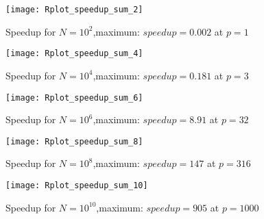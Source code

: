 \documentclass[11pt]{scrartcl} %
\begin{document}
\begin{figure}[H] %
	\centering
	\texttt{[image: Rplot\_speedup\_sum\_2]} %
	\caption{Speedup for $N=10^2$,maximum: $speedup = 0.002$ at $p = 1$}
\end{figure}


\begin{figure}[H] %
	\centering
	\texttt{[image: Rplot\_speedup\_sum\_4]} %
	\caption{Speedup for $N=10^4$,maximum: $speedup = 0.181$ at $p = 3$}
\end{figure}

\begin{figure}[H] %
	\centering
	\texttt{[image: Rplot\_speedup\_sum\_6]} %
	\caption{Speedup for $N=10^6$,maximum: $speedup = 8.91$ at $p = 32$}
\end{figure}
\begin{figure}[H] %
	\centering
	\texttt{[image: Rplot\_speedup\_sum\_8]} %
	\caption{Speedup for $N=10^8$,maximum: $speedup = 147$ at $p = 316$}
\end{figure}
\begin{figure}[H] %
	\centering
	\texttt{[image: Rplot\_speedup\_sum\_10]} %
	\caption{Speedup for $N=10^10$,maximum: $speedup = 905$ at $p = 1000$}
\end{figure}
\end{document}
